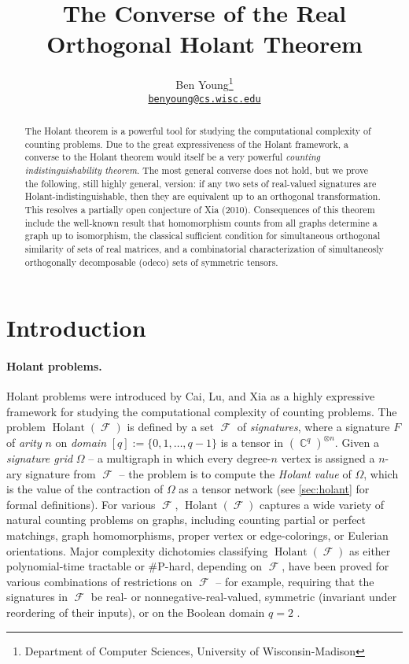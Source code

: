 \documentclass{article}
\title{The Converse of the Real Orthogonal Holant Theorem}
\author{ Ben Young\footnote{Department of Computer Sciences, University of Wisconsin-Madison}\\
\texttt{\href{mailto:benyoung@cs.wisc.edu}{benyoung@cs.wisc.edu}}}
\date{}
\theoremstyle{remark}
\theoremstyle{definition}
\DeclareMathOperator{\cc}{\mathbb{C}}
\DeclareMathOperator{\fc}{\mathcal{F}}
\DeclareMathOperator{\holant}{Holant}
\begin{document}
\maketitle

\begin{abstract}
The Holant theorem is a powerful tool for studying the computational complexity of
counting problems. Due to the great expressiveness of the Holant framework,
a converse to the Holant theorem would itself be a very powerful 
\emph{counting indistinguishability theorem}. The most general converse does not hold, but we prove
the following, still highly general, version:
if any two sets of real-valued signatures are Holant-indistinguishable, then they are equivalent 
up to an orthogonal transformation. This resolves a partially open conjecture of Xia (2010).
Consequences of this theorem include the well-known result that homomorphism counts from all graphs
determine a graph up to isomorphism, the classical sufficient condition for simultaneous orthogonal
similarity of sets of real matrices,
and a combinatorial characterization of simultaneosly orthogonally decomposable (odeco) sets of 
symmetric tensors.
\end{abstract}

\section{Introduction}
\paragraph{Holant problems.}

Holant problems were introduced by Cai, Lu, and Xia \cite{cai_computational_2011} as a highly
expressive framework for studying the computational complexity of counting problems. 
The problem $\holant(\fc)$ is defined by a set $\fc$ of \emph{signatures}, 
where a signature $F$ of \emph{arity}
$n$ on \emph{domain} $[q] := \{0,1,\ldots,q-1\}$ is a tensor in $(\cc^q)^{\otimes n}$. 
Given a \emph{signature grid} $\Omega$ -- a multigraph in which every degree-$n$ vertex is assigned a
$n$-ary signature from $\fc$ --
the problem is to compute the \emph{Holant value} of $\Omega$, which is the value
of the contraction of $\Omega$ as a tensor network (see \autoref{sec:holant} for formal definitions). 
For various $\fc$, $\holant(\fc)$ captures a wide variety of natural counting problems on
graphs, including counting partial or perfect matchings, graph homomorphisms, 
proper vertex or edge-colorings, or Eulerian orientations.
Major complexity dichotomies classifying $\holant(\fc)$ as either 
polynomial-time tractable or \#P-hard,
depending on $\fc$, have been proved for various combinations of restrictions on $\fc$ -- for example,
requiring that the signatures in $\fc$ be real- or nonnegative-real-valued, symmetric
(invariant under reordering of their inputs), or on the Boolean domain $q=2$
\cite{huang_2016_dichotomy,cai_complete_2016,cai2015holant,lin_complexity_2018,shao}.
\end{document}
